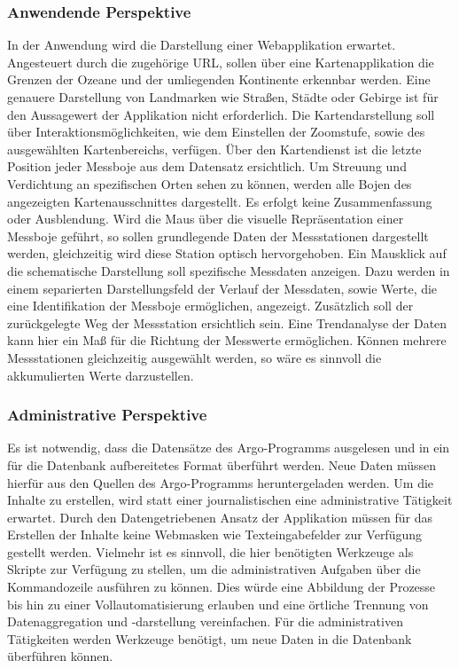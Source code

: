     \subsubsection{Anwendende Perspektive}\label{sec:funkAnforderungenAnwender}

    In der Anwendung wird die Darstellung einer Webapplikation erwartet. Angesteuert durch die zugehörige URL,
    sollen über eine Kartenapplikation die Grenzen der Ozeane und der umliegenden Kontinente erkennbar werden.  Eine genauere Darstellung von Landmarken wie Straßen, Städte oder Gebirge ist für den Aussagewert der Applikation nicht erforderlich. Die Kartendarstellung soll über Interaktionsmöglichkeiten, wie dem Einstellen der Zoomstufe, sowie des ausgewählten Kartenbereichs, verfügen. Über den Kartendienst ist die letzte Position jeder Messboje aus dem Datensatz ersichtlich. Um Streuung und Verdichtung an spezifischen Orten sehen zu können, werden alle Bojen des angezeigten Kartenausschnittes dargestellt. Es erfolgt keine Zusammenfassung oder Ausblendung.
    Wird die Maus über die visuelle Repräsentation einer Messboje geführt, so sollen grundlegende Daten der Messstationen dargestellt werden, gleichzeitig wird diese Station optisch hervorgehoben.
    Ein Mausklick auf die schematische Darstellung soll spezifische Messdaten anzeigen. Dazu werden in einem separierten Darstellungsfeld der Verlauf der Messdaten, sowie Werte, die eine Identifikation der Messboje ermöglichen, angezeigt. Zusätzlich soll der zurückgelegte Weg der Messstation ersichtlich sein.  Eine Trendanalyse der Daten kann hier ein Maß für die Richtung der Messwerte ermöglichen. Können mehrere Messstationen gleichzeitig ausgewählt werden, so wäre es sinnvoll die akkumulierten Werte darzustellen.

    \subsubsection{Administrative Perspektive} \label{sec:funkAnforderungenAdmin}

    Es ist notwendig, dass die Datensätze des Argo-Programms ausgelesen und in ein für die Datenbank aufbereitetes Format überführt werden. Neue Daten müssen hierfür aus den Quellen des Argo-Programms heruntergeladen werden. Um die Inhalte zu erstellen, wird statt einer journalistischen eine administrative Tätigkeit erwartet. Durch den Datengetriebenen Ansatz der Applikation müssen für das Erstellen der Inhalte keine Webmasken wie Texteingabefelder zur Verfügung gestellt werden. Vielmehr ist es sinnvoll, die hier benötigten Werkzeuge als Skripte zur Verfügung zu stellen, um die administrativen Aufgaben über die Kommandozeile ausführen zu können. Dies würde eine Abbildung der Prozesse bis hin zu einer Vollautomatisierung erlauben und eine örtliche Trennung von Datenaggregation und -darstellung vereinfachen.
    Für die administrativen Tätigkeiten werden Werkzeuge benötigt, um neue Daten  in die Datenbank überführen können.


